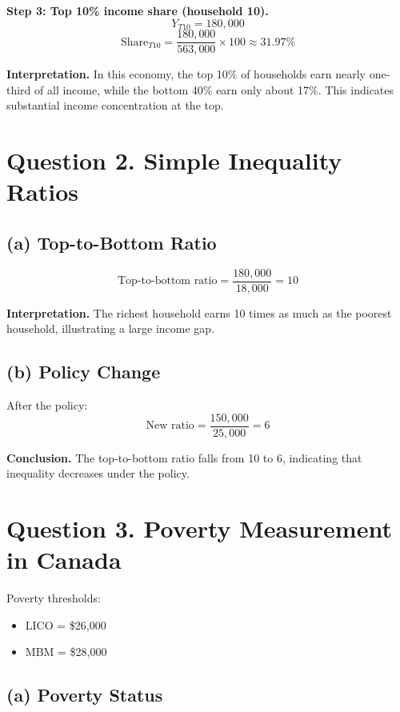 \documentclass[11pt]{article}
\begin{document}
\textbf{Step 3: Top 10\% income share (household 10).}
\[
Y_{T10}=180{,}000
\]
\[
\text{Share}_{T10}=\frac{180{,}000}{563{,}000}\times 100 \approx 31.97\%
\]

\textbf{Interpretation.}  
In this economy, the top 10\% of households earn nearly one-third of all income, while the bottom 40\% earn only about 17\%. This indicates substantial income concentration at the top.

\section*{Question 2. Simple Inequality Ratios}

\subsection*{(a) Top-to-Bottom Ratio}

\[
\text{Top-to-bottom ratio}=\frac{180{,}000}{18{,}000}=10
\]

\textbf{Interpretation.}  
The richest household earns 10 times as much as the poorest household, illustrating a large income gap.

\subsection*{(b) Policy Change}

After the policy:
\[
\text{New ratio}=\frac{150{,}000}{25{,}000}=6
\]

\textbf{Conclusion.}  
The top-to-bottom ratio falls from 10 to 6, indicating that inequality decreases under the policy.

\section*{Question 3. Poverty Measurement in Canada}

Poverty thresholds:
\begin{itemize}
\item LICO = \$26{,}000
\item MBM = \$28{,}000
\end{itemize}

\subsection*{(a) Poverty Status}
\end{document}
